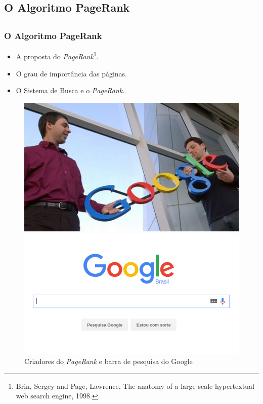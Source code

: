\documentclass{beamer}
\begin{document}
\begin{frame}
	\section{O Algoritmo PageRank}
	\subsection{}
	\frametitle{O Algoritmo PageRank}

\begin{itemize}
	\item A proposta do \textit{PageRank}\footnote{\tiny \justifying Brin, Sergey and Page, Lawrence, The anatomy of a large-scale hypertextual web search engine, 1998.}.
	\vspace{0.2cm}	
	\item O grau de importância das páginas.
	\vspace{0.2cm}
	\item O Sistema de Busca e o \textit{PageRank}.
\end{itemize}	

\vspace{0.3cm}
	
\begin{figure}[!htb]
	\centering
	\includegraphics[scale=0.23]{figures/larry}
	\hspace{0.1cm}
	\includegraphics[scale=0.2]{figures/google}\\
	{\scriptsize Criadores do \textit{PageRank} e barra de pesquisa do Google}
\end{figure}	 

\end{frame}
\end{document}
